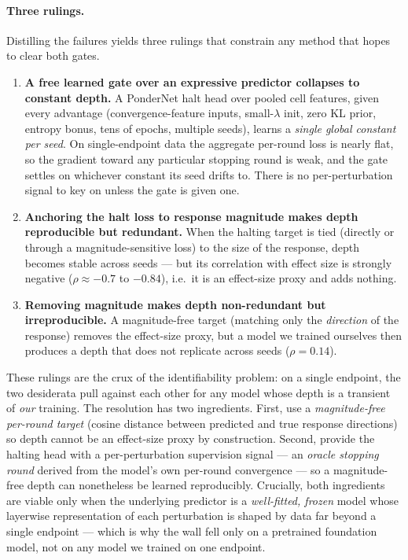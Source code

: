 \documentclass[11pt]{article}
\let\mathrho\rho
\renewcommand{\rho}{\ensuremath{\mathrho}}
\begin{document}
\paragraph{Three rulings.} Distilling the failures yields three rulings that constrain any method
that hopes to clear both gates.

\begin{enumerate}[leftmargin=1.4em,itemsep=2pt]
\item \textbf{A free learned gate over an expressive predictor collapses to constant depth.} A
PonderNet halt head over pooled cell features, given every advantage (convergence-feature inputs,
small-$\lambda$ init, zero KL prior, entropy bonus, tens of epochs, multiple seeds), learns a
\emph{single global constant per seed}. On single-endpoint data the aggregate per-round loss is
nearly flat, so the gradient toward any particular stopping round is weak, and the gate settles on
whichever constant its seed drifts to. There is no per-perturbation signal to key on unless the
gate is given one.
\item \textbf{Anchoring the halt loss to response magnitude makes depth reproducible but
redundant.} When the halting target is tied (directly or through a magnitude-sensitive loss) to
the size of the response, depth becomes stable across seeds --- but its correlation with effect
size is strongly negative (\rho{}$\approx-0.7$ to $-0.84$), i.e.\ it is an effect-size proxy and
adds nothing.
\item \textbf{Removing magnitude makes depth non-redundant but irreproducible.} A magnitude-free
target (matching only the \emph{direction} of the response) removes the effect-size proxy, but a
model we trained ourselves then produces a depth that does not replicate across seeds
(\rho{}$=0.14$).
\end{enumerate}

These rulings are the crux of the identifiability problem: on a single endpoint, the two
desiderata pull against each other for any model whose depth is a transient of \emph{our}
training. The resolution has two ingredients. First, use a \emph{magnitude-free per-round
target} (cosine distance between predicted and true response directions) so depth cannot be an
effect-size proxy by construction. Second, provide the halting head with a per-perturbation
supervision signal --- an \emph{oracle stopping round} derived from the model's own per-round
convergence --- so a magnitude-free depth can nonetheless be learned reproducibly. Crucially,
both ingredients are viable only when the underlying predictor is a \emph{well-fitted, frozen}
model whose layerwise representation of each perturbation is shaped by data far beyond a single
endpoint --- which is why the wall fell only on a pretrained foundation model, not on any model we
trained on one endpoint.
\end{document}
